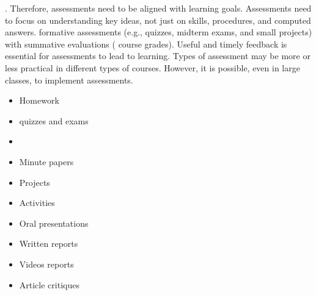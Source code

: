 .
Therefore, assessments need to be aligned with learning goals.
Assessments need to focus on  understanding key ideas, not just on skills, procedures, and computed answers.  formative assessments  (e.g., quizzes, midterm exams, and small projects)  with summative evaluations ( course grades). Useful and timely feedback is essential for assessments to lead to learning.  Types of assessment may be more or less practical in different types of courses.
However, it is possible, even in large classes, to implement   assessments. \\

\vspace{.2in}

\noindent{}
\begin{itemize}[leftmargin=1cm, itemsep=.2em]
\item Homework
\item {} quizzes and exams
\item {}
\item Minute papers
\item Projects
\item Activities
\item Oral presentations
\item Written reports
\item Videos reports
\item Article critiques
\end{itemize}

 \vspace{.2in}
\noindent{}

\renewcommand{\labelitemi}{$\checkmark$}

